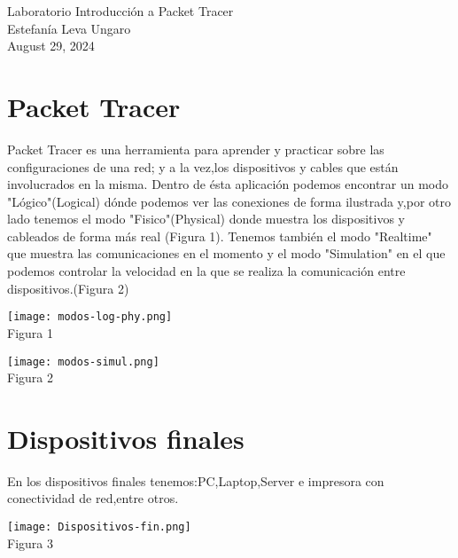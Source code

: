 \documentclass[]{article}
\title{}
\author{}
\begin{document}
\begin{center}
	Laboratorio Introducción a Packet Tracer \\
	Estefanía Leva Ungaro \\
	August 29, 2024
\end{center}
\maketitle


\section{Packet Tracer}
Packet Tracer es una herramienta para aprender y practicar sobre las configuraciones de una red; y a la vez,los dispositivos y cables que están involucrados en la misma. Dentro de ésta aplicación podemos encontrar un modo "Lógico"(Logical) dónde podemos ver las conexiones de forma ilustrada y,por otro lado tenemos el modo "Fisico"(Physical) donde muestra los dispositivos y cableados de forma más real (Figura 1). Tenemos también el modo "Realtime" que muestra las comunicaciones en el momento y el modo "Simulation" en el que podemos controlar la velocidad en la que se realiza la comunicación entre dispositivos.(Figura 2)
\begin{center}
	\texttt{[image: modos-log-phy.png]} \\  %
	Figura 1
\end{center}

\vspace{10pt}  %

\begin{center}
	\texttt{[image: modos-simul.png]} \\  %
	Figura 2
\end{center}
\section{Dispositivos finales}
En los dispositivos finales tenemos:PC,Laptop,Server e impresora con conectividad de red,entre otros.
\begin{center}
	\texttt{[image: Dispositivos-fin.png]} \\  %
	Figura 3
\end{center}
\end{document}
